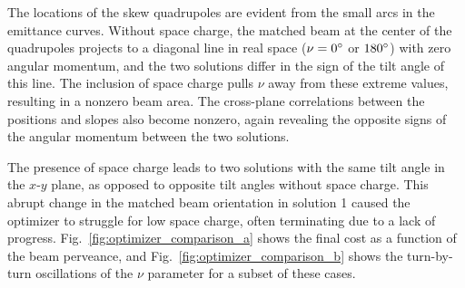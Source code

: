 %
The locations of the skew quadrupoles are evident from the small arcs in the emittance curves. Without space charge, the matched beam at the center of the quadrupoles projects to a diagonal line in real space ($\nu = 0\degree$ or $180\degree$) with zero angular momentum, and the two solutions differ in the sign of the tilt angle of this line. The inclusion of space charge pulls $\nu$ away from these extreme values, resulting in a nonzero beam area. The cross-plane correlations between the positions and slopes also become nonzero, again revealing the opposite signs of the angular momentum between the two solutions. 

The presence of space charge leads to two solutions with the same tilt angle in the $x$-$y$ plane, as opposed to opposite tilt angles without space charge. This abrupt change in the matched beam orientation in solution 1 caused the optimizer to struggle for low space charge, often terminating due to a lack of progress. Fig.~\ref{fig:optimizer_comparison_a} shows the final cost as a function of the beam perveance, and Fig.~\ref{fig:optimizer_comparison_b} shows the turn-by-turn oscillations of the $\nu$ parameter for a subset of these cases. 
%
